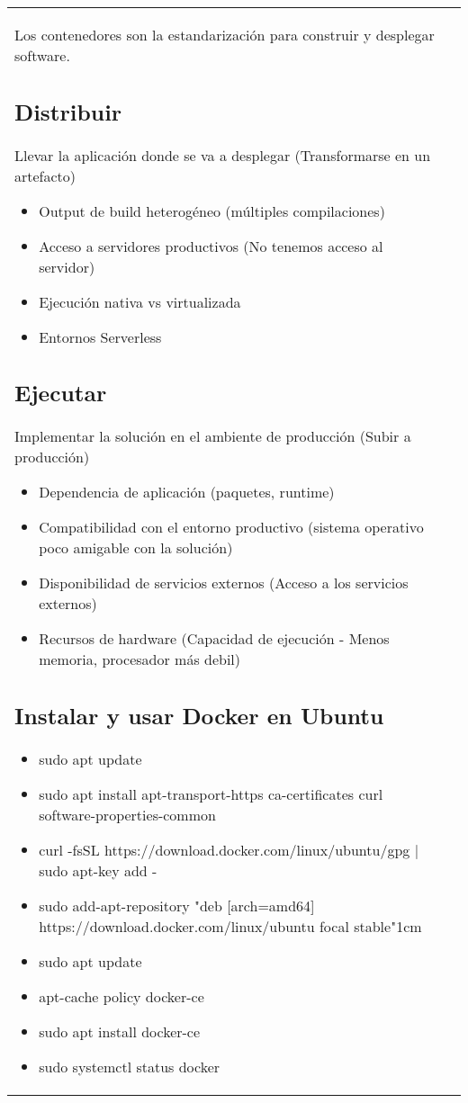 \documentclass[letterpaper,11pt]{article}
\begin{document}
\begin{tabular*}{7in}{l@{\extracolsep{\fill}}r}
    Los contenedores son la estandarización para construir y desplegar software.
    
    \subsection{Distribuir}
    Llevar la aplicación donde se va a desplegar (Transformarse en un artefacto)
    
    \begin{itemize}
        \item Output de build heterogéneo (múltiples compilaciones)
        \item Acceso a servidores productivos (No tenemos acceso al servidor)
        \item Ejecución nativa vs virtualizada
        \item Entornos Serverless
    \end{itemize}
    
    \subsection{Ejecutar}
    Implementar la solución en el ambiente de producción (Subir a producción)
    
    \begin{itemize}
        \item Dependencia de aplicación (paquetes, runtime)
        \item Compatibilidad con el entorno productivo (sistema operativo poco amigable con la solución)
        \item Disponibilidad de servicios externos (Acceso a los servicios externos)
        \item Recursos de hardware (Capacidad de ejecución - Menos memoria, procesador más debil)
    \end{itemize}
    
    \subsection{Instalar y usar Docker en Ubuntu}
    
    \begin{itemize}
        \item sudo apt update
        \item sudo apt install apt-transport-https ca-certificates curl software-properties-common
        \item curl -fsSL https://download.docker.com/linux/ubuntu/gpg | sudo apt-key add -
        \item sudo add-apt-repository "deb [arch=amd64] https://download.docker.com/linux/ubuntu focal stable"1cm
        \item sudo apt update
        \item apt-cache policy docker-ce
        \item sudo apt install docker-ce
        \item sudo systemctl status docker
    

\end{itemize}
\end{tabular*}
\end{document}
